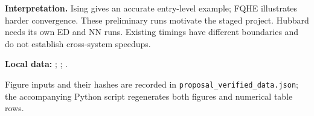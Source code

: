 \documentclass[10pt,letterpaper]{article}
\begin{document}
\textbf{Interpretation.} Ising gives an accurate entry-level example; FQHE illustrates harder convergence. These preliminary runs motivate the staged project. Hubbard needs its own ED and NN runs. Existing timings have different boundaries and do not establish cross-system speedups.

{\footnotesize\raggedright\textbf{Local data:} ;
;
.\par
Figure inputs and their hashes are recorded in \texttt{proposal\_verified\_data.json}; the accompanying Python script regenerates both figures and numerical table rows.\par}
\fi
\end{document}

